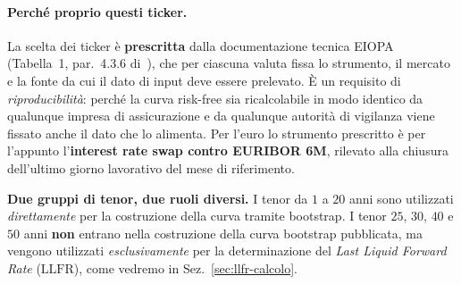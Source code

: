 \documentclass[11pt,a4paper]{article}
\theoremstyle{plain}
\theoremstyle{definition}
\theoremstyle{remark}
\newcommand{\LLFR}{\mathrm{LLFR}}
\begin{document}
\paragraph{Perch\'e proprio questi ticker.}
La scelta dei ticker \`e \textbf{prescritta} dalla documentazione tecnica
EIOPA (Tabella~1, par.~4.3.6 di~\cite{eiopa2026}), che per ciascuna valuta fissa lo strumento,
il mercato e la fonte da cui il dato di input deve essere prelevato. \`E un requisito di
\emph{riproducibilit\`a}: perch\'e la curva risk-free sia ricalcolabile in modo identico da
qualunque impresa di assicurazione e da qualunque autorit\`a di vigilanza viene fissato 
anche il dato che lo alimenta. Per l'euro lo strumento prescritto
\`e per l'appunto l'\textbf{interest rate swap contro EURIBOR 6M}, rilevato alla chiusura dell'ultimo
giorno lavorativo del mese di riferimento.





\begin{warningbox}
\textbf{Due gruppi di tenor, due ruoli diversi.} I tenor da $1$ a $20$ anni sono utilizzati
\emph{direttamente} per la costruzione della curva tramite bootstrap. I tenor $25$, $30$, $40$
e $50$ anni \textbf{non} entrano nella costruzione della curva bootstrap pubblicata, ma
vengono utilizzati \emph{esclusivamente} per la determinazione del \emph{Last Liquid Forward
Rate} ($\LLFR$), come vedremo in Sez.~\ref{sec:llfr-calcolo}.
\end{warningbox}
\end{document}
